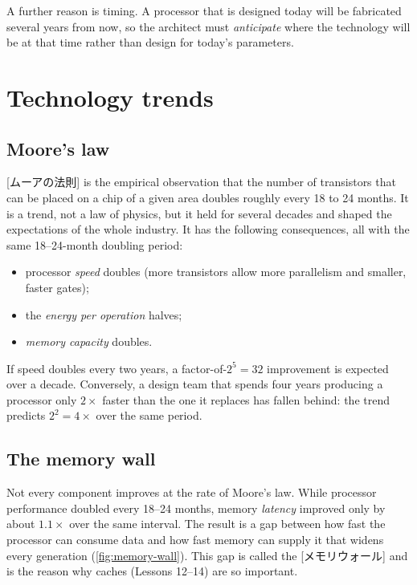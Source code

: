 \documentclass[../main.tex]{subfiles}
\begin{document}
A further reason is timing.  A processor that is designed today will be
fabricated several years from now, so the architect must \emph{anticipate}
where the technology will be at that time rather than design for today's
parameters.

\section{Technology trends}

\subsection{Moore's law}

[ムーアの法則] is the empirical observation that the number
of transistors that can be placed on a chip of a given area doubles roughly
every 18 to 24 months.  It is a trend, not a law of physics, but it held for several decades
and shaped the expectations of the whole industry.  It has the
following consequences, all with the same 18--24-month doubling
period:
\begin{itemize}
  \item processor \emph{speed} doubles (more transistors allow more
    parallelism and smaller, faster gates);
  \item the \emph{energy per operation} halves;
  \item \emph{memory capacity} doubles.
\end{itemize}

\begin{example}
  If speed doubles every two years, a factor-of-$2^{5} = 32$ improvement is
  expected over a decade.  Conversely, a design team that spends four years
  producing a processor only $2\times$ faster than the one it replaces has
  fallen behind: the trend predicts $2^{2} = 4\times$ over the same period.
\end{example}

\subsection{The memory wall}

Not every component improves at the rate of Moore's law.  While processor
performance
doubled every 18--24 months, memory \emph{latency} improved only by about
$1.1\times$ over the same interval.  The result is a gap between how fast the processor
can consume data and how fast memory can supply it that widens every
generation (\cref{fig:memory-wall}).  This gap is called the [メモリウォール] and
is the reason why caches (Lessons 12--14) are so important.
\end{document}

